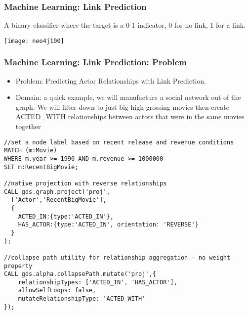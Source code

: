 \begin{frame}[fragile]\frametitle{Machine Learning: Link Prediction}

A binary classifier where the target is a 0-1 indicator, 0 for no link, 1 for a link.

\begin{center}
\texttt{[image: neo4j100]}
\end{center}	

\end{frame}

\begin{frame}[fragile]\frametitle{Machine Learning: Link Prediction: Problem}

\begin{itemize}
\item Problem: Predicting Actor Relationships with Link Prediction.
\item Domain:  a quick example, we will manufacture a social network out of the graph. We will filter down to just big high grossing movies then create ACTED\_WITH relationships between actors that were in the same movies together
\end{itemize}

\begin{lstlisting}
//set a node label based on recent release and revenue conditions
MATCH (m:Movie)
WHERE m.year >= 1990 AND m.revenue >= 1000000
SET m:RecentBigMovie;

//native projection with reverse relationships
CALL gds.graph.project('proj',
  ['Actor','RecentBigMovie'],
  {
  	ACTED_IN:{type:'ACTED_IN'},
    HAS_ACTOR:{type:'ACTED_IN', orientation: 'REVERSE'}
  }
);

//collapse path utility for relationship aggregation - no weight property
CALL gds.alpha.collapsePath.mutate('proj',{
    relationshipTypes: ['ACTED_IN', 'HAS_ACTOR'],
    allowSelfLoops: false,
    mutateRelationshipType: 'ACTED_WITH'
});
\end{lstlisting}

\end{frame}

